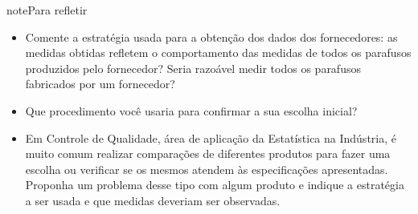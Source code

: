 \begin{sphinxadmonition}{note}{Para refletir}{}

\begin{itemize}
\item Comente a estratégia usada para a obtenção dos dados dos fornecedores: as medidas obtidas refletem o comportamento das medidas de todos os parafusos produzidos pelo fornecedor? Seria razoável medir todos os parafusos fabricados por um fornecedor?

\item Que procedimento você usaria para confirmar a sua escolha inicial?

\item Em Controle de Qualidade, área de aplicação da Estatística na Indústria, é muito comum realizar comparações de diferentes produtos para fazer uma escolha ou verificar se os mesmos atendem às especificações apresentadas. Proponha um problema desse tipo com algum produto e indique a estratégia a ser usada e que medidas deveriam ser observadas.

\end{itemize}
\end{sphinxadmonition}


